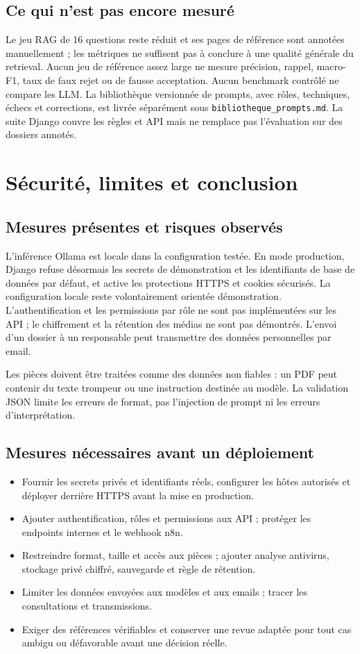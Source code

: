 \documentclass[10pt,a4paper]{article}
\newcommand{\code}[1]{\texttt{\small #1}}
\begin{document}
\subsection*{Ce qui n’est pas encore mesuré}
Le jeu RAG de 16 questions reste réduit et ses pages de référence sont annotées manuellement ; les métriques ne suffisent pas à conclure à une qualité générale du retrieval. Aucun jeu de référence assez large ne mesure précision, rappel, macro-F1, taux de faux rejet ou de fausse acceptation. Aucun benchmark contrôlé ne compare les LLM. La bibliothèque versionnée de prompts, avec rôles, techniques, échecs et corrections, est livrée séparément sous \code{bibliotheque\_prompts.md}. La suite Django couvre les règles et API mais ne remplace pas l’évaluation sur des dossiers annotés.

\newpage
\section{Sécurité, limites et conclusion}
\subsection*{Mesures présentes et risques observés}
L’inférence Ollama est locale dans la configuration testée. En mode production, Django refuse désormais les secrets de démonstration et les identifiants de base de données par défaut, et active les protections HTTPS et cookies sécurisés. La configuration locale reste volontairement orientée démonstration. L’authentification et les permissions par rôle ne sont pas implémentées sur les API ; le chiffrement et la rétention des médias ne sont pas démontrés. L’envoi d’un dossier à un responsable peut transmettre des données personnelles par email.

Les pièces doivent être traitées comme des données non fiables : un PDF peut contenir du texte trompeur ou une instruction destinée au modèle. La validation JSON limite les erreurs de format, pas l’injection de prompt ni les erreurs d’interprétation.

\subsection*{Mesures nécessaires avant un déploiement}
\begin{itemize}
\item Fournir les secrets privés et identifiants réels, configurer les hôtes autorisés et déployer derrière HTTPS avant la mise en production.
\item Ajouter authentification, rôles et permissions aux API ; protéger les endpoints internes et le webhook n8n.
\item Restreindre format, taille et accès aux pièces ; ajouter analyse antivirus, stockage privé chiffré, sauvegarde et règle de rétention.
\item Limiter les données envoyées aux modèles et aux emails ; tracer les consultations et transmissions.
\item Exiger des références vérifiables et conserver une revue adaptée pour tout cas ambigu ou défavorable avant une décision réelle.
\end{itemize}
\end{document}
